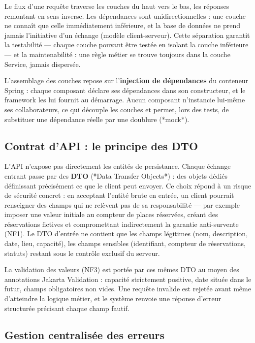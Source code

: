 \documentclass[12pt,a4paper]{report}
\begin{document}
Le flux d'une requête traverse les couches du haut vers le bas, les réponses remontant en sens inverse. Les dépendances sont unidirectionnelles : une couche ne connaît que celle immédiatement inférieure, et la base de données ne prend jamais l'initiative d'un échange (modèle client-serveur). Cette séparation garantit la testabilité — chaque couche pouvant être testée en isolant la couche inférieure — et la maintenabilité : une règle métier se trouve toujours dans la couche Service, jamais dispersée.

L'assemblage des couches repose sur l'\textbf{injection de dépendances} du conteneur Spring : chaque composant déclare ses dépendances dans son constructeur, et le framework les lui fournit au démarrage. Aucun composant n'instancie lui-même ses collaborateurs, ce qui découple les couches et permet, lors des tests, de substituer une dépendance réelle par une doublure (*mock*).

\subsection{Contrat d'API : le principe des DTO}

L'API n'expose pas directement les entités de persistance. Chaque échange entrant passe par des \textbf{DTO} (*Data Transfer Objects*) : des objets dédiés définissant précisément ce que le client peut envoyer. Ce choix répond à un risque de sécurité concret : en acceptant l'entité brute en entrée, un client pourrait renseigner des champs qui ne relèvent pas de sa responsabilité — par exemple imposer une valeur initiale au compteur de places réservées, créant des réservations fictives et compromettant indirectement la garantie anti-survente (NF1). Le DTO d'entrée ne contient que les champs légitimes (nom, description, date, lieu, capacité), les champs sensibles (identifiant, compteur de réservations, statuts) restant sous le contrôle exclusif du serveur.

La validation des valeurs (NF3) est portée par ces mêmes DTO au moyen des annotations Jakarta Validation : capacité strictement positive, date située dans le futur, champs obligatoires non vides. Une requête invalide est rejetée avant même d'atteindre la logique métier, et le système renvoie une réponse d'erreur structurée précisant chaque champ fautif.

\subsection{Gestion centralisée des erreurs}
\end{document}
